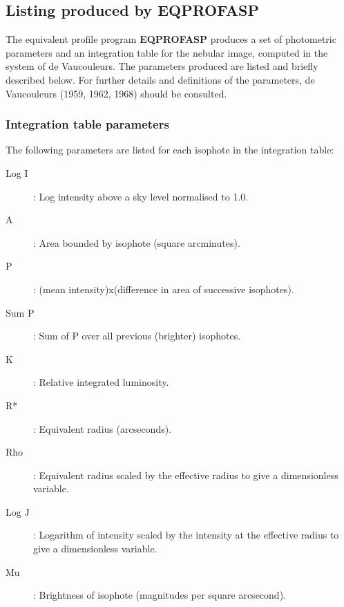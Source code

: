 \subsection {Listing produced by EQPROFASP}
The equivalent profile program {\bf EQPROFASP} produces a set of photometric
parameters and an integration table for the nebular image, computed in the
system of de Vaucouleurs.
The parameters produced are listed and briefly described below.
For further details and definitions of the parameters, de Vaucouleurs (1959,
1962, 1968) should be consulted.
\subsubsection {Integration table parameters}
The following parameters are listed for each isophote in the integration table:
\begin{description}
\begin{description}
\item [Log I]: Log intensity above a sky level normalised to 1.0.
\item [A]: Area bounded by isophote (square arcminutes).
\item [P]: (mean intensity)x(difference in area of successive isophotes).
\item [Sum P]: Sum of P over all previous (brighter) isophotes.
\item [K]: Relative integrated luminosity.
\item [R*]: Equivalent radius (arcseconds).
\item [Rho]: Equivalent radius scaled by the effective radius to give a
dimensionless variable.
\item [Log J]: Logarithm of intensity scaled by the intensity at the effective
radius to give a dimensionless variable.
\item [Mu]: Brightness of isophote (magnitudes per square arcsecond).
\end{description}
\end{description}
